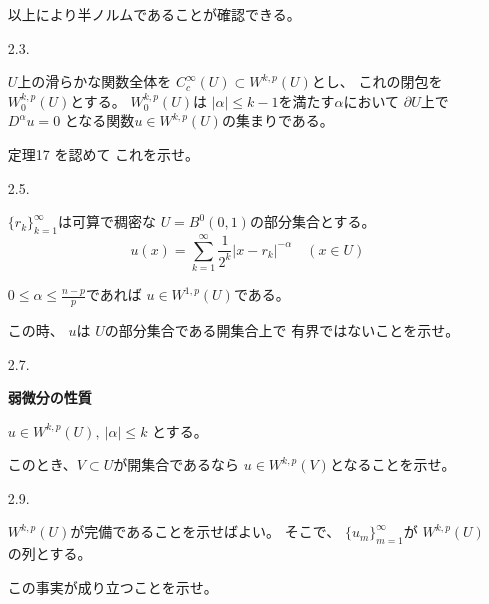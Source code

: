 \documentclass[12pt,b5paper]{ltjsarticle}
\begin{document}
\begin{enumerate}
       以上により半ノルムであることが確認できる。

       \hrulefill

 \item [2.3.]

       $U$上の滑らかな関数全体を
       $C^{\infty}_{c}(U) \subset W^{k,p}(U)$とし、
       これの閉包を$W_{0}^{k,p}(U)$とする。
       $W_{0}^{k,p}(U)$は
       $\lvert \alpha \rvert \leq k-1$を満たす$\alpha$において
       $\partial U$上で
       $D^{\alpha}u =0$
       となる関数$u\in W^{k,p}(U)$の集まりである。

       定理17
       を認めて
       これを示せ。

       \dotfill



       \hrulefill

 \item [2.5.]

       $\{r_{k}\}_{k=1}^{\infty}$は可算で稠密な
       $U=B^{0}(0,1)$の部分集合とする。
       \begin{equation}
        u(x) =
         \sum_{k=1}^{\infty} \frac{1}{2^{k}} \lvert x-r_{k} \rvert ^{-\alpha}
         \quad
         (x\in U)
       \end{equation}

       $0 \leq \alpha \leq \frac{n-p}{p}$であれば
       $u\in W^{1,p}(U)$である。

       この時、
       $u$は
       $U$の部分集合である開集合上で
       有界ではないことを示せ。
       

       \dotfill

       \hrulefill

 \item [2.7.]


       \textbf{弱微分の性質}
       
       $u\in W^{k,p}(U),\: \lvert \alpha \rvert \leq k$
       とする。

       このとき、$V\subset U$が開集合であるなら
       $u\in W^{k,p}(V)$となることを示せ。

       \dotfill

       \hrulefill

 \item [2.9.]

       $W^{k,p}(U)$が完備であることを示せばよい。
       そこで、
       $\{u_{m}\}_{m=1}^{\infty}$が
       $W^{k,p}(U)$の列とする。

       この事実が成り立つことを示せ。

       \dotfill

       \hrulefill

\end{enumerate}

\hrulefill
\end{document}
